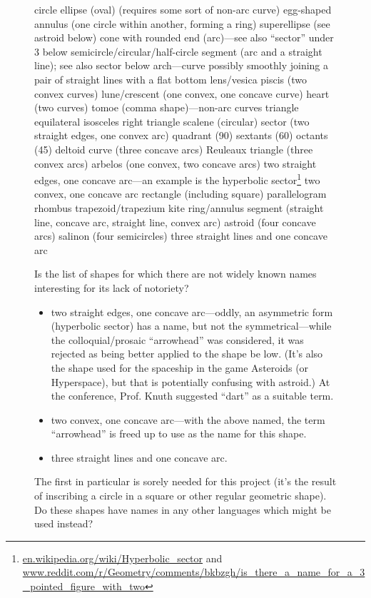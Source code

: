 \documentclass{ltxdoc}
\begin{document}
\begin{figure}
\begin{outline}
   \2 circle
   \2 ellipse (oval) (requires some sort of non-arc curve)
      \3 egg-shaped
   \2 annulus (one circle within another, forming  a ring)
   \2 superellipse (see astroid below)
   \2 cone with rounded end (arc)—see also ``sector'' under 3 below
   \2 semicircle/circular/half-circle segment (arc and a straight line); see also sector below
   \2 arch---curve possibly smoothly joining a  pair of straight lines with a flat bottom
   \2 lens/vesica piscis (two convex curves)
   \2 lune/crescent (one convex, one concave  curve)
   \2 heart (two curves)
   \2 tomoe (comma shape)---non-arc curves
   \2 triangle
      \3 equilateral
      \3 isosceles
      \3 right triangle
      \3 scalene
   \2 (circular) sector (two straight edges, one convex arc)
      \3 quadrant (90\textdegree)
      \3 sextants (60\textdegree)
      \3 octants (45\textdegree)
   \2 deltoid curve (three concave arcs)
   \2  Reuleaux triangle (three convex arcs)
   \2 arbelos (one convex, two concave arcs)
   \2 two straight edges, one concave arc---an example is the hyperbolic sector\footnote{\url{en.wikipedia.org/wiki/Hyperbolic_sector} and
 \url{www.reddit.com/r/Geometry/comments/bkbzgh/is_there_a_name_for_a_3_pointed_figure_with_two}}
   \2 two convex, one concave arc
   \2 rectangle (including square)
   \2 parallelogram
   \2 rhombus
   \2 trapezoid/trapezium
   \2 kite
   \2 ring/annulus segment (straight line, concave arc, straight line, convex arc)
   \2 astroid (four concave arcs)
   \2 salinon (four semicircles)
   \2 three straight lines and one concave arc
\end{outline}


  Is the list of shapes for which there are not widely
 known names interesting for its lack of notoriety?

\begin{itemize}
 \item two straight edges, one concave arc—oddly, an
 asymmetric form (hyperbolic sector) has a name,
 but not the symmetrical---while the colloquial/prosaic “arrowhead” was considered, it was
 rejected as being better applied to the shape be
low. (It’s also the shape used for the spaceship
 in the game Asteroids (or Hyperspace), but that
 is potentially confusing with astroid.) At the
 conference, Prof. Knuth suggested “dart” as a
 suitable term.
 \item two convex, one concave arc—with the above
 named, the term “arrowhead” is freed up to use
 as the name for this shape.
 \item three straight lines and one concave arc.
 \end{itemize}

 The first in particular is sorely needed for this project
 (it’s the result of inscribing a circle in a square or
 other regular geometric shape). Do these shapes
 have names in any other languages which might be
 used instead?
\end{figure}
\end{document}

